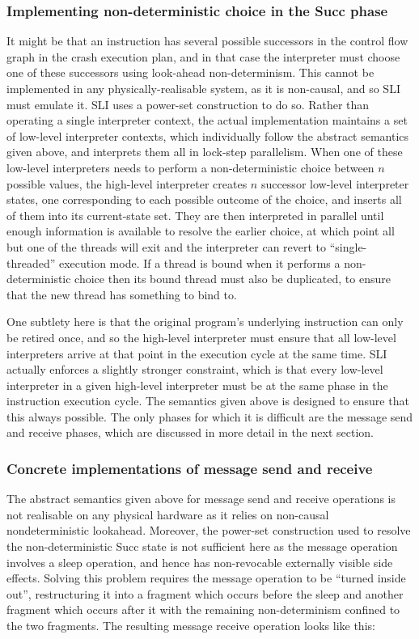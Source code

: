 \subsubsection{Implementing non-deterministic choice in the Succ phase}

It might be that an instruction has several possible successors in the
control flow graph in the crash execution plan, and in that case the
interpreter must choose one of these successors using look-ahead
non-determinism.  This cannot be implemented in any
physically-realisable system, as it is non-causal, and so SLI must
emulate it.  SLI uses a power-set construction to do so.  Rather than
operating a single interpreter context, the actual implementation
maintains a set of low-level interpreter contexts, which individually
follow the abstract semantics given above, and interprets them all in
lock-step parallelism.  When one of these low-level interpreters needs
to perform a non-deterministic choice between $n$ possible values, the
high-level interpreter creates $n$ successor low-level interpreter
states, one corresponding to each possible outcome of the choice, and
inserts all of them into its current-state set.  They are then
interpreted in parallel until enough information is available to
resolve the earlier choice, at which point all but one of the threads
will exit and the interpreter can revert to ``single-threaded''
execution mode.  If a thread is bound when it performs a
non-deterministic choice then its bound thread must also be
duplicated, to ensure that the new thread has something to bind to.

One subtlety here is that the original program's underlying
instruction can only be retired once, and so the high-level
interpreter must ensure that all low-level interpreters arrive at that
point in the execution cycle at the same time.  SLI actually enforces
a slightly stronger constraint, which is that every low-level
interpreter in a given high-level interpreter must be at the same
phase in the instruction execution cycle.  The semantics given above
is designed to ensure that this always possible.  The only phases for
which it is difficult are the message send and receive phases, which
are discussed in more detail in the next section.

\subsubsection{Concrete implementations of message send and receive}

The abstract semantics given above for message send and receive
operations is not realisable on any physical hardware as it relies on
non-causal nondeterministic lookahead.  Moreover, the power-set
construction used to resolve the non-deterministic Succ state is not
sufficient here as the message operation involves a sleep operation,
and hence has non-revocable externally visible side effects.  Solving
this problem requires the message operation to be ``turned inside
out'', restructuring it into a fragment which occurs before the sleep
and another fragment which occurs after it with the remaining
non-determinism confined to the two fragments.  The resulting message
receive operation looks like this:

